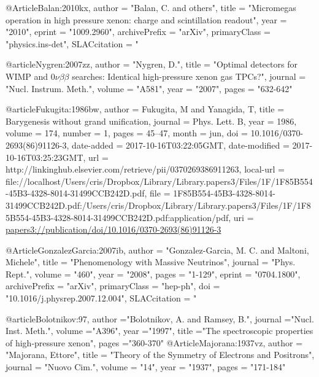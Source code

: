 @Article{Balan:2010kx,
     author    = "Balan, C. and others",
     title     = "{Micromegas operation in high pressure xenon: charge and
                  scintillation readout}",
     year      = "2010",
     eprint    = "1009.2960",
     archivePrefix = "arXiv",
     primaryClass  =  "physics.ins-det",
     SLACcitation  = "%
}

@article{Nygren:2007zz,
     author	= "Nygren, D.",
     title     	= "{Optimal detectors for WIMP and $0\nu\beta\beta$ searches:
                  	Identical high-pressure xenon gas TPCs?}",
     journal  = "Nucl. Instrum. Meth.",
     volume  = "A581",
     year	 = "2007",
     pages   = "632-642"
}

@article{Fukugita:1986bw,
author = {Fukugita, M and Yanagida, T},
title = {{Barygenesis without grand unification}},
journal = {Phys. Lett. B},
year = {1986},
volume = {174},
number = {1},
pages = {45--47},
month = jun,
doi = {10.1016/0370-2693(86)91126-3},
date-added = {2017-10-16T03:22:05GMT},
date-modified = {2017-10-16T03:25:23GMT},
url = {http://linkinghub.elsevier.com/retrieve/pii/0370269386911263},
local-url = {file://localhost/Users/cris/Dropbox/Library/Library.papers3/Files/1F/1F85B554-45B3-4328-8014-31499CCB242D.pdf},
file = {{1F85B554-45B3-4328-8014-31499CCB242D.pdf:/Users/cris/Dropbox/Library/Library.papers3/Files/1F/1F85B554-45B3-4328-8014-31499CCB242D.pdf:application/pdf}},
uri = {\url{papers3://publication/doi/10.1016/0370-2693(86)91126-3}}
}

@Article{GonzalezGarcia:2007ib,
     author    = "Gonzalez-Garcia, M. C. and Maltoni, Michele",
     title     = "{Phenomenology with Massive Neutrinos}",
     journal   = "Phys. Rept.",
     volume    = "460",
     year      = "2008",
     pages     = "1-129",
     eprint    = "0704.1800",
     archivePrefix = "arXiv",
     primaryClass  =  "hep-ph",
     doi       = "10.1016/j.physrep.2007.12.004",
     SLACcitation  = "%
}

@article{Bolotnikov:97,
	author	="Bolotnikov, A. and Ramsey, B.",
	journal	="Nucl. Inst. Meth.",
	volume	="A396",
	year		="1997",
	title		="The spectroscopic properties of high-pressure xenon",
	pages	="360-370"
}
@Article{Majorana:1937vz,
	author	= "Majorana, Ettore",
	title	= "{Theory of the Symmetry of Electrons and Positrons}",
	journal	= "Nuovo Cim.",
	volume	= "14",
	year		= "1937",
	pages	= "171-184"
}

